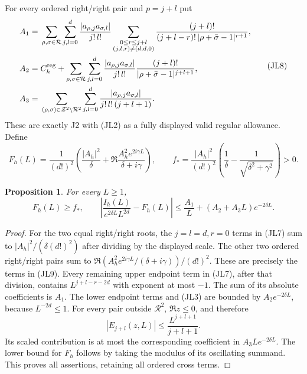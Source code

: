 \documentclass[11pt]{article}
\newtheorem{proposition}{Proposition}
\begin{document}
For every ordered right/right pair and \(p=j+l\) put
\[
\begin{split}
A_1={}&\sum_{\rho,\sigma\in\mathcal R}\sum_{j,l=0}^d
\frac{|a_{\rho,j}a_{\sigma,l}|}{j!\,l!}
\sum_{\substack{0\le r\le j+l\\(j,l,r)\ne(d,d,0)}}
\frac{(j+l)!}{(j+l-r)!\,|\rho+\bar\sigma-1|^{r+1}},\\
A_2={}&C_h^{\rm reg}+
\sum_{\rho,\sigma\in\mathcal R}\sum_{j,l=0}^d
\frac{|a_{\rho,j}a_{\sigma,l}|}{j!\,l!}
\frac{(j+l)!}{|\rho+\bar\sigma-1|^{j+l+1}},\\
A_3={}&
\sum_{(\rho,\sigma)\in\mathcal Z^2\setminus\mathcal R^2}
\sum_{j,l=0}^d
\frac{|a_{\rho,j}a_{\sigma,l}|}{j!\,l!\,(j+l+1)}.
\end{split}
\tag{JL8}
\]
These are exactly J2 with (JL2) as a fully displayed valid regular
allowance.  Define
\[
F_h(L)=\frac1{(d!)^2}
\left(\frac{|A_h|^2}{\delta}
+\Re\frac{A_h^2e^{2i\gamma L}}{\delta+i\gamma}\right),
\qquad
f_*=\frac{|A_h|^2}{(d!)^2}
\left(\frac1\delta-\frac1{\sqrt{\delta^2+\gamma^2}}\right)>0.
\tag{JL9}
\]

\begin{proposition}
For every \(L\ge1\),
\[
F_h(L)\ge f_*,
\qquad
\left|\frac{I_h(L)}{e^{2\delta L}L^{2d}}-F_h(L)\right|
\le \frac{A_1}{L}+(A_2+A_3L)e^{-2\delta L}.
\tag{JL10}
\]
\end{proposition}
\begin{proof}
For the two equal right/right roots, the \(j=l=d,r=0\) terms in
(JL7) sum to
\(|A_h|^2/(\delta(d!)^2)\) after dividing by the displayed scale.
The other two ordered right/right pairs sum to
\(\Re(A_h^2e^{2i\gamma L}/(\delta+i\gamma))/(d!)^2\).
These are precisely the terms in (JL9).
Every remaining upper endpoint term in (JL7), after that division,
contains \(L^{j+l-r-2d}\) with exponent at most \(-1\).
The sum of its absolute coefficients is \(A_1\).
The lower endpoint terms and (JL3) are bounded by
\(A_2e^{-2\delta L}\), because \(L^{-2d}\le1\).
For every pair outside \(\mathcal R^2\), \(\Re z\le0\), and therefore
\[
|E_{j+l}(z,L)|\le \frac{L^{j+l+1}}{j+l+1}.
\]
Its scaled contribution is at most the corresponding coefficient in
\(A_3Le^{-2\delta L}\).
The lower bound for \(F_h\) follows by taking the modulus of its
oscillating summand.  This proves all assertions, retaining all ordered
cross terms.
\end{proof}
\end{document}
